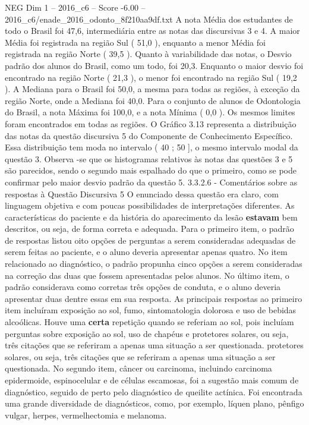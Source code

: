\begin{textsample}{NEG Dim 1 – 2016\_c6 – Score -6.00 – 2016\_c6/enade\_2016\_odonto\_8f210aa9df.txt}
A nota Média dos estudantes de todo o Brasil foi 47,6, intermediária entre as notas das discursivas 3 e 4.
A maior Média foi registrada na região Sul ( 51,0 ), enquanto a menor Média foi registrada na região Norte ( 39,5 ).
Quanto à variabilidade das notas, o Desvio padrão dos alunos do Brasil, como um todo, foi 20,3.
Enquanto o maior desvio foi encontrado na região Norte ( 21,3 ), o menor foi encontrado na região Sul ( 19,2 ).
A Mediana para o Brasil foi 50,0, a mesma para todas as regiões, à exceção da região Norte, onde a Mediana foi 40,0.
Para o conjunto de alunos de Odontologia do Brasil, a nota Máxima foi 100,0, e a nota Mínima ( 0,0 ).
Os mesmos limites foram encontrados em todas as regiões.
O Gráfico 3.13 representa a distribuição das notas da questão discursiva 5 do Componente de Conhecimento Específico.
Essa distribuição tem moda no intervalo ( 40 ; 50 ], o mesmo intervalo modal da questão 3.
Observa -se que os histogramas relativos às notas das questões 3 e 5 são parecidos, sendo o segundo mais espalhado do que o primeiro, como se pode confirmar pelo maior desvio padrão da questão 5. 3.3.2.6 - Comentários sobre as respostas à Questão Discursiva 5 O enunciado dessa questão era claro, com linguagem objetiva e com poucas possibilidades de interpretações diferentes.
As características do paciente e da história do aparecimento da lesão \textbf{estavam} bem descritos, ou seja, de forma correta e adequada.
Para o primeiro item, o padrão de respostas listou oito opções de perguntas a serem consideradas adequadas de serem feitas ao paciente, e o aluno deveria apresentar apenas quatro.
No item relacionado ao diagnóstico, o padrão propunha cinco opções a serem consideradas na correção das duas que fossem apresentadas pelos alunos.
No último item, o padrão considerava como corretas três opções de conduta, e o aluno deveria apresentar duas dentre essas em sua resposta.
As principais respostas ao primeiro item incluíram exposição ao sol, fumo, sintomatologia dolorosa e uso de bebidas alcoólicas.
Houve uma \textbf{certa} repetição quando se referiam ao sol, pois incluíam perguntas sobre exposição ao sol, uso de chapéus e protetores solares, ou seja, três citações que se referiram a apenas uma situação a ser questionada. protetores solares, ou seja, três citações que se referiram a apenas uma situação a ser questionada.
No segundo item, câncer ou carcinoma, incluindo carcinoma epidermoide, espinocelular e de células escamosas, foi a sugestão mais comum de diagnóstico, seguido de perto pelo diagnóstico de queilite actínica.
Foi encontrada uma grande diversidade de diagnósticos, como, por exemplo, líquen plano, pênfigo vulgar, herpes, vermelhectomia e melanoma.

\end{textsample}
